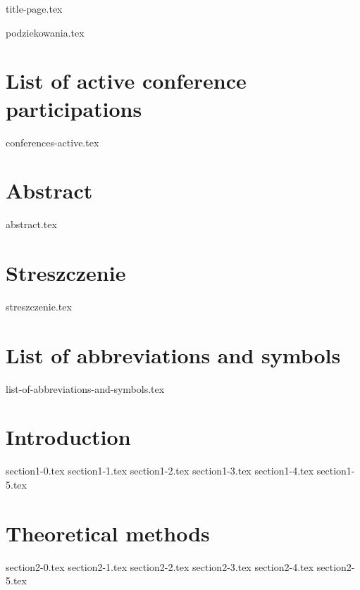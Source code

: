 \documentclass[12pt, a4paper]{report}
\begin{document}
{title-page.tex}

{podziekowania.tex}

\tableofcontents

\cleardoublepage
{}
\printbibliography[title={List of publications being a~part of the Thesis}, keyword=primary]

\cleardoublepage
{}
\printbibliography[title={List of other publications}, keyword=ternary, resetnumbers]

\cleardoublepage
\chapter*{List of active conference participations}
{conferences-active.tex}

\onehalfspacing
\chapter*{Abstract}
{abstract.tex}

\chapter*{Streszczenie}
{streszczenie.tex}

\singlespacing
\chapter*{List of abbreviations and symbols}
{list-of-abbreviations-and-symbols.tex}

\chapter{Introduction}

\onehalfspacing
{section1-0.tex}
{section1-1.tex}
{section1-2.tex}
{section1-3.tex}
{section1-4.tex}
{section1-5.tex}

\chapter{Theoretical methods}

{section2-0.tex}
{section2-1.tex}
{section2-2.tex}
{section2-3.tex}
{section2-4.tex}
{section2-5.tex}
\end{document}
